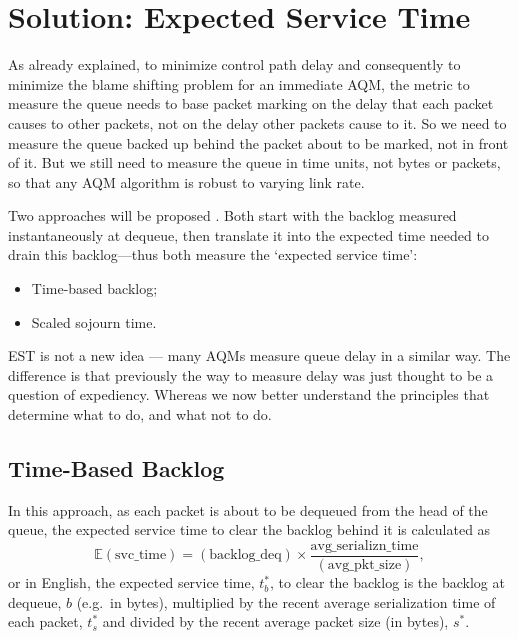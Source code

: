 \section{Solution: Expected Service Time}\label{sec:exp_svc_time}

As already explained, to minimize control path delay and consequently to minimize the blame shifting problem for an immediate AQM, the metric to measure the queue needs to base packet marking on the delay that each packet causes to other packets, not on the delay other packets cause to it. So we need to measure the queue backed up behind the packet about to be marked, not in front of it. But we still need to measure the queue in time units, not bytes or packets, so that any AQM algorithm is robust to varying link rate.

Two approaches will be proposed . Both start with the backlog measured instantaneously at dequeue, then translate it into the expected time needed to drain this backlog---thus both measure the `expected service time':
\begin{itemize}[nosep]
	\item Time-based backlog;
	\item Scaled sojourn time.
\end{itemize}

EST is not a new idea --- many AQMs measure queue delay in a similar way. The difference is that previously the way to measure delay was just thought to be a question of expediency. Whereas we now better understand the principles that determine what to do, and what not to do.

\subsection{Time-Based Backlog}\label{sec:time-based_backlog}

In this approach, as each packet is about to be dequeued from the head of the queue, the expected service time to clear the backlog behind it is calculated as
\[\mathbb{E}(\mathrm{svc\_time}) = \mathrm{(backlog\_deq)}\times \frac{\mathrm{avg\_serializn\_time}}{\mathrm{(avg\_pkt\_size)}},\]
or in English, the expected service time, \(t_b^*\), to clear the backlog is the backlog at dequeue, \(b\) (e.g.\ in bytes), multiplied by the recent average serialization time of each packet, \(t_s^*\) and divided by the recent average packet size (in bytes), \(s^*\).

